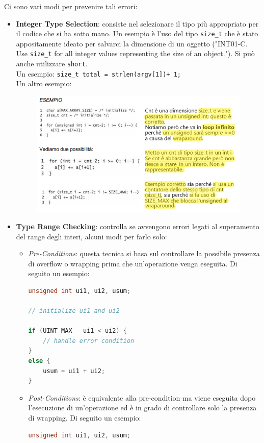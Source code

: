 Ci sono vari modi per prevenire tali errori:

\begin{itemize}
    \item \textbf{Integer Type Selection}:
          consiste nel selezionare il tipo più
          appropriato per il codice che si ha sotto mano.
          Un esempio è l'uso del tipo \verb|size_t| che è stato appositamente ideato per salvarci la
          dimensione di un oggetto
          ("INT01-C. Use \verb|size_t| for all integer values representing the size of
          an object.").
          Si può anche utilizzare \verb|short|.\\
          Un esempio: \verb|size_t total = strlen(argv[1])+ 1;|\\
          Un altro esempio:
          \begin{figure}[H]
              \centering
              \includegraphics[width=12cm, keepaspectratio]{capitoli/secure_coding/img/cap_2/esempio_sizet_mod.png}
          \end{figure}

    \item \textbf{Type Range Checking}:
          controlla se avvengono errori legati al superamento del range degli interi,
          alcuni modi per farlo solo: \begin{itemize}
              \item \textit{Pre-Conditions}:
                    questa tecnica si basa sul controllare la possibile presenza di
                    overflow o wrapping prima che un'operazione venga eseguita.
                    Di seguito un esempio:
                    \begin{lstlisting}[language=C]
unsigned int ui1, ui2, usum;

// initialize ui1 and ui2

if (UINT_MAX - ui1 < ui2) {
    // handle error condition
}
else {
    usum = ui1 + ui2;
}
                    \end{lstlisting}
              \item \textit{Post-Conditions}:
                    è equivalente alla pre-condition ma viene eseguita dopo
                    l'esecuzione di un'operazione ed è in grado di controllare solo la
                    presenza di wrapping. Di seguito un esempio:
                    \begin{lstlisting}[language=C]
    unsigned int ui1, ui2, usum;


\end{lstlisting}
\end{itemize}
\end{itemize}
